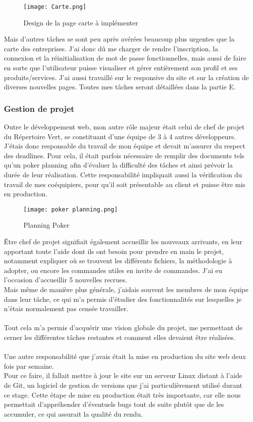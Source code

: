 \begin{figure}[H]
    \centering
    \texttt{[image: Carte.png]}
    \caption{Design de la page carte à implémenter}
\end{figure}


Mais d'autres tâches se sont peu après avérées beaucoup plus urgentes que la carte des entreprises. J'ai donc dû me charger de rendre l'inscription, la connexion et la réinitialisation de mot de passe fonctionnelles, 
mais aussi de faire en sorte que l'utilisateur puisse visualiser et gérer entièrement son profil et ses produits/services. J'ai aussi travaillé sur le responsive du site et sur la création de diverses nouvelles pages. Toutes mes tâches seront détaillées dans la partie E.

\subsubsection{Gestion de projet}

Outre le développement web, mon autre rôle majeur était celui de chef de projet du Répertoire Vert, se constituant d'une équipe de 3 à 4 autres développeurs.
J'étais donc responsable du travail de mon équipe et devait m'assurer du respect des deadlines. Pour cela, il était parfois nécessaire de remplir des documents tels qu'un poker planning afin d'évaluer la difficulté des tâches et ainsi prévoir la durée de leur réalisation.
Cette responsabilité impliquait aussi la vérification du travail de mes coéquipiers, pour qu'il soit présentable au client et puisse être mis en production.
\begin{figure}[H]
    \centering
    \texttt{[image: poker planning.png]}
    \caption{Planning Poker}
\end{figure}

Être chef de projet signifiait également accueillir les nouveaux arrivants, en leur apportant toute l'aide dont ils ont besoin pour prendre en main le projet, notamment expliquer où se trouvent les différents fichiers, la méthodologie à adopter, ou encore les commandes utiles en invite de commandes. J'ai eu l'occasion d'accueillir 5 nouvelles recrues.
\\Mais même de manière plus générale, j'aidais souvent les membres de mon équipe dans leur tâche, ce qui m'a permis d'étudier des fonctionnalités sur lesquelles je n'étais normalement pas censée travailler.
\\\\
Tout cela m'a permis d'acquérir une vision globale du projet, me permettant de cerner les différentes tâches restantes et comment elles devaient être réalisées.
\\\\
Une autre responsabilité que j'avais était la mise en production du site web deux fois par semaine. 
\\Pour ce faire, il fallait mettre à jour le site sur un serveur Linux distant à l'aide de Git, un logiciel de gestion de versions que j'ai particulièrement utilisé durant ce stage. Cette étape de mise en production était très importante, car elle nous permettait d'appréhender d'éventuels bugs tout de suite plutôt que de les accumuler, ce qui assurait la qualité du rendu.


